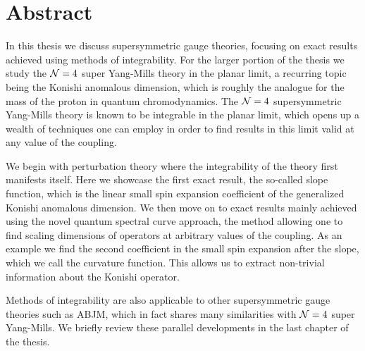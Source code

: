
\section*{Abstract}

\vspace{30pt}


In this thesis we discuss supersymmetric gauge theories, focusing on exact results achieved using methods of integrability. 
For the larger portion of the thesis we study the $\mathcal{N}=4$ super Yang-Mills theory in the planar limit, a recurring topic being the Konishi anomalous dimension, which is roughly the analogue for the mass of the proton in quantum chromodynamics.
The $\mathcal{N}=4$ supersymmetric Yang-Mills theory is known to be integrable in the planar limit, which opens up a wealth of techniques one can employ in order to find results in this limit valid at any value of the coupling. 

We begin with perturbation theory where the integrability of the theory first manifests itself.
Here we showcase the first exact result, the so-called slope function, which is the linear small spin expansion coefficient of the generalized Konishi anomalous dimension.
We then move on to exact results mainly achieved using the novel quantum spectral curve approach, the method allowing one to find scaling dimensions of operators at arbitrary values of the coupling.
As an example we find the second coefficient in the small spin expansion after the slope, which we call the curvature function.
This allows us to extract non-trivial information about the Konishi operator.

Methods of integrability are also applicable to other supersymmetric gauge theories such as ABJM, which in fact shares many similarities with $\mathcal{N}=4$ super Yang-Mills. We briefly review these parallel developments in the last chapter of the thesis.

